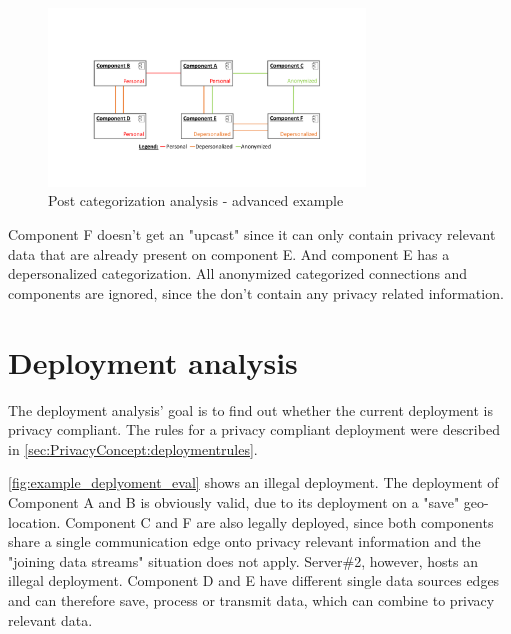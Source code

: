 \begin{figure}[h]
	\centering
	\includegraphics[trim = 35mm 40mm 40mm 45mm, clip, width=0.75\textwidth]{graphs/component_categorization_examples_upcast_advanced}
	\caption{Post categorization analysis - advanced example}
	\label{fig:example_categorization:advanced}
\end{figure}

Component F doesn't get an "upcast" since it can only contain privacy relevant data that are already present on component E. And component E has a depersonalized categorization. All anonymized categorized connections and components are ignored, since the don't contain any privacy related information.


\section{Deployment analysis}
\label{sec:PrivacyAnalysis:deployment}

The deployment analysis' goal is to find out whether the current deployment is privacy compliant. The rules for a privacy compliant deployment were described in \autoref{sec:PrivacyConcept:deploymentrules}.

\autoref{fig:example_deplyoment_eval} shows an illegal deployment. The deployment of Component A and B is obviously valid, due to its deployment on a "save" geo-location. Component C and F are also legally deployed, since both components share a single communication edge onto privacy relevant information and the "joining data streams" situation does not apply. Server\#2, however, hosts an illegal deployment. Component D and E have different single data sources edges and can therefore save, process or transmit data, which can combine to privacy relevant data.

